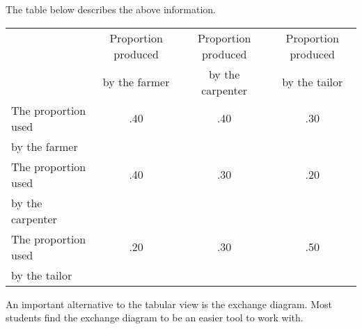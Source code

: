 \begin{solution}
    The table below describes the above information.

    \begin{center}
        \begin{tabular}{lccc}
            \hline
                                & Proportion produced & Proportion produced & Proportion produced \\
                                & by the farmer       & by the carpenter    & by the tailor       \\
            \hline
            The proportion used & .40                 & .40                 & .30                 \\
            by the farmer       &                     &                     &                     \\
            The proportion used & .40                 & .30                 & .20                 \\
            by the carpenter    &                     &                     &                     \\
            The proportion used & .20                 & .30                 & .50                 \\
            by the tailor       &                     &                     &                     \\
            \hline
        \end{tabular}
    \end{center}

    An important alternative to the tabular view is the exchange diagram. Most students find the exchange diagram to be an easier tool to work with.

    \begin{center}
        \label{fig:exchange_diagram_farmer_carpenter_tailor}
    \end{center}



\end{solution}
